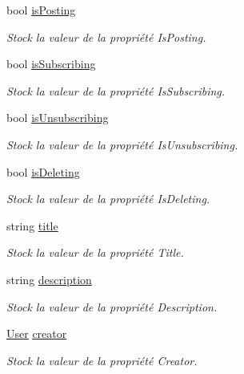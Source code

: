 \begin{DoxyCompactItemize}
bool \hyperlink{class_boxes_1_1_view_models_1_1_box_view_model_a909bf513a4480f468fdf9d6212c99104}{is\+Posting}
\begin{DoxyCompactList}\small\item\em Stock la valeur de la propriété {\ttfamily Is\+Posting}. \end{DoxyCompactList}\item 
bool \hyperlink{class_boxes_1_1_view_models_1_1_box_view_model_ae865069cd94b77fedbc7cb8e220e3dda}{is\+Subscribing}
\begin{DoxyCompactList}\small\item\em Stock la valeur de la propriété {\ttfamily Is\+Subscribing}. \end{DoxyCompactList}\item 
bool \hyperlink{class_boxes_1_1_view_models_1_1_box_view_model_a47dd859f9c78c367d7ad20cb0d64590e}{is\+Unsubscribing}
\begin{DoxyCompactList}\small\item\em Stock la valeur de la propriété {\ttfamily Is\+Unsubscribing}. \end{DoxyCompactList}\item 
bool \hyperlink{class_boxes_1_1_view_models_1_1_box_view_model_a6630347a51df0e27d17781b5ac1606ba}{is\+Deleting}
\begin{DoxyCompactList}\small\item\em Stock la valeur de la propriété {\ttfamily Is\+Deleting}. \end{DoxyCompactList}\item 
string \hyperlink{class_boxes_1_1_view_models_1_1_box_view_model_a9943f1631624497eb5f2d6b4940b5825}{title}
\begin{DoxyCompactList}\small\item\em Stock la valeur de la propriété {\ttfamily Title}. \end{DoxyCompactList}\item 
string \hyperlink{class_boxes_1_1_view_models_1_1_box_view_model_a822fd258489309723c493ce381df9a2e}{description}
\begin{DoxyCompactList}\small\item\em Stock la valeur de la propriété {\ttfamily Description}. \end{DoxyCompactList}\item 
\hyperlink{class_boxes_1_1_models_1_1_user}{User} \hyperlink{class_boxes_1_1_view_models_1_1_box_view_model_a381eb3cf2b289876f9563b38ed542ba7}{creator}
\begin{DoxyCompactList}\small\item\em Stock la valeur de la propriété {\ttfamily Creator}. \end{DoxyCompactList}\item 

\end{DoxyCompactItemize}
